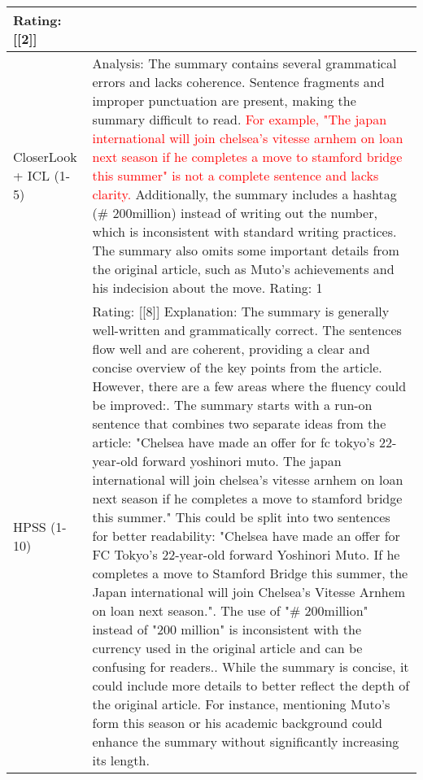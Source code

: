 \begin{table*}[!ht]
\begin{tabular}{p{55pt}p{365pt}}
    Rating: [[2]] \\
    \midrule
    CloserLook + ICL (1-5) & Analysis: The summary contains several grammatical errors and lacks coherence. Sentence fragments and improper punctuation are present, making the summary difficult to read. \textcolor{red}{For example, "The japan international will join chelsea's vitesse arnhem on loan next season if he completes a move to stamford bridge this summer" is not a complete sentence and lacks clarity.} Additionally, the summary includes a hashtag (\# 200million) instead of writing out the number, which is inconsistent with standard writing practices. The summary also omits some important details from the original article, such as Muto's achievements and his indecision about the move.\newline\newline
    Rating: 1  \\
    \midrule 
    HPSS (1-10)  & Rating: [[8]]\newline\newline
    Explanation:\newline
    The summary is generally well-written and grammatically correct. The sentences flow well and are coherent, providing a clear and concise overview of the key points from the article. However, there are a few areas where the fluency could be improved:\newline\newline
    1. The summary starts with a run-on sentence that combines two separate ideas from the article: "Chelsea have made an offer for fc tokyo's 22-year-old forward yoshinori muto. The japan international will join chelsea's vitesse arnhem on loan next season if he completes a move to stamford bridge this summer." This could be split into two sentences for better readability: "Chelsea have made an offer for FC Tokyo's 22-year-old forward Yoshinori Muto. If he completes a move to Stamford Bridge this summer, the Japan international will join Chelsea's Vitesse Arnhem on loan next season."\newline\newline
    2. The use of "\# 200million" instead of "200 million" is inconsistent with the currency used in the original article and can be confusing for readers.\newline\newline
    3. While the summary is concise, it could include more details to better reflect the depth of the original article. For instance, mentioning Muto's form this season or his academic background could enhance the summary without significantly increasing its length.\newline\newline

\end{tabular}
\end{table*}
